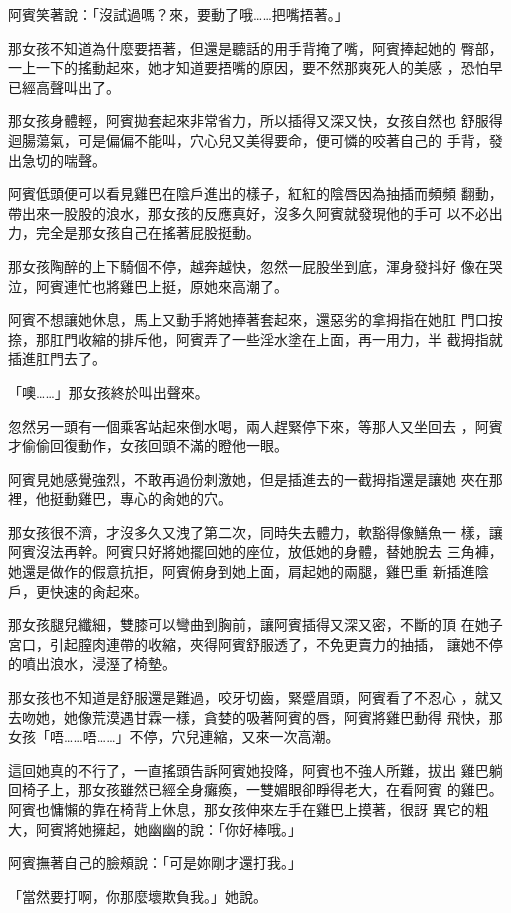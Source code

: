 阿賓笑著說：「沒試過嗎？來，要動了哦……把嘴捂著。」

那女孩不知道為什麼要捂著，但還是聽話的用手背掩了嘴，阿賓捧起她的
臀部，一上一下的搖動起來，她才知道要捂嘴的原因，要不然那爽死人的美感
，恐怕早已經高聲叫出了。

那女孩身體輕，阿賓拋套起來非常省力，所以插得又深又快，女孩自然也
舒服得迴腸蕩氣，可是偏偏不能叫，穴心兒又美得要命，便可憐的咬著自己的
手背，發出急切的喘聲。

阿賓低頭便可以看見雞巴在陰戶進出的樣子，紅紅的陰唇因為抽插而頻頻
翻動，帶出來一股股的浪水，那女孩的反應真好，沒多久阿賓就發現他的手可
以不必出力，完全是那女孩自己在搖著屁股挺動。

那女孩陶醉的上下騎個不停，越奔越快，忽然一屁股坐到底，渾身發抖好
像在哭泣，阿賓連忙也將雞巴上挺，原她來高潮了。

阿賓不想讓她休息，馬上又動手將她捧著套起來，還惡劣的拿拇指在她肛
門口按捺，那肛門收縮的排斥他，阿賓弄了一些淫水塗在上面，再一用力，半
截拇指就插進肛門去了。

「噢……」那女孩終於叫出聲來。

忽然另一頭有一個乘客站起來倒水喝，兩人趕緊停下來，等那人又坐回去
，阿賓才偷偷回復動作，女孩回頭不滿的瞪他一眼。

阿賓見她感覺強烈，不敢再過份刺激她，但是插進去的一截拇指還是讓她
夾在那裡，他挺動雞巴，專心的肏她的穴。

那女孩很不濟，才沒多久又洩了第二次，同時失去體力，軟豁得像鱔魚一
樣，讓阿賓沒法再幹。阿賓只好將她擺回她的座位，放低她的身體，替她脫去
三角褲，她還是做作的假意抗拒，阿賓俯身到她上面，肩起她的兩腿，雞巴重
新插進陰戶，更快速的肏起來。

那女孩腿兒纖細，雙膝可以彎曲到胸前，讓阿賓插得又深又密，不斷的頂
在她子宮口，引起膣肉連帶的收縮，夾得阿賓舒服透了，不免更賣力的抽插，
讓她不停的噴出浪水，浸溼了椅墊。

那女孩也不知道是舒服還是難過，咬牙切齒，緊蹙眉頭，阿賓看了不忍心
，就又去吻她，她像荒漠遇甘霖一樣，貪婪的吸著阿賓的唇，阿賓將雞巴動得
飛快，那女孩「唔……唔……」不停，穴兒連縮，又來一次高潮。

這回她真的不行了，一直搖頭告訴阿賓她投降，阿賓也不強人所難，拔出
雞巴躺回椅子上，那女孩雖然已經全身癱瘓，一雙媚眼卻睜得老大，在看阿賓
的雞巴。阿賓也慵懶的靠在椅背上休息，那女孩伸來左手在雞巴上摸著，很訝
異它的粗大，阿賓將她擁起，她幽幽的說：「你好棒哦。」

阿賓撫著自己的臉頰說：「可是妳剛才還打我。」

「當然要打啊，你那麼壞欺負我。」她說。

